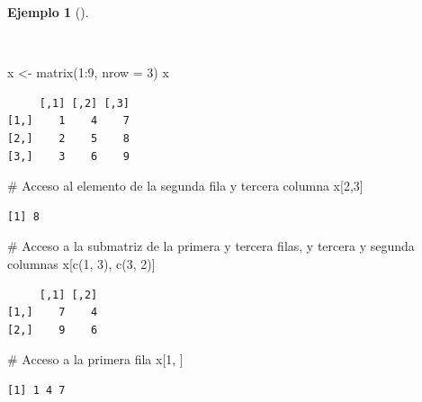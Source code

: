 \documentclass[
  a4paper,
]{scrreport}
\newenvironment{Shaded}{\begin{snugshade}}{\end{snugshade}}
\newcommand{\AttributeTok}[1]{\textcolor[rgb]{0.40,0.45,0.13}{#1}}
\newcommand{\CommentTok}[1]{\textcolor[rgb]{0.37,0.37,0.37}{#1}}
\newcommand{\DecValTok}[1]{\textcolor[rgb]{0.68,0.00,0.00}{#1}}
\newcommand{\FunctionTok}[1]{\textcolor[rgb]{0.28,0.35,0.67}{#1}}
\newcommand{\NormalTok}[1]{\textcolor[rgb]{0.00,0.23,0.31}{#1}}
\newcommand{\OtherTok}[1]{\textcolor[rgb]{0.00,0.23,0.31}{#1}}
\newcommand{\SpecialCharTok}[1]{\textcolor[rgb]{0.37,0.37,0.37}{#1}}
\theoremstyle{definition}
\theoremstyle{definition}
\newtheorem{example}{Ejemplo}[chapter]
\theoremstyle{remark}
\begin{document}
\begin{example}[]\protect\hypertarget{exm-acceso-matriz}{}\label{exm-acceso-matriz}

~

\begin{Shaded}
\begin{Highlighting}[]
\NormalTok{x }\OtherTok{\textless{}{-}} \FunctionTok{matrix}\NormalTok{(}\DecValTok{1}\SpecialCharTok{:}\DecValTok{9}\NormalTok{, }\AttributeTok{nrow =} \DecValTok{3}\NormalTok{)}
\NormalTok{x}
\end{Highlighting}
\end{Shaded}

\begin{verbatim}
     [,1] [,2] [,3]
[1,]    1    4    7
[2,]    2    5    8
[3,]    3    6    9
\end{verbatim}

\begin{Shaded}
\begin{Highlighting}[]
\CommentTok{\# Acceso al elemento de la segunda fila y tercera columna}
\NormalTok{x[}\DecValTok{2}\NormalTok{,}\DecValTok{3}\NormalTok{]}
\end{Highlighting}
\end{Shaded}

\begin{verbatim}
[1] 8
\end{verbatim}

\begin{Shaded}
\begin{Highlighting}[]
\CommentTok{\# Acceso a la submatriz de la primera y tercera filas, y tercera y segunda columnas}
\NormalTok{x[}\FunctionTok{c}\NormalTok{(}\DecValTok{1}\NormalTok{, }\DecValTok{3}\NormalTok{), }\FunctionTok{c}\NormalTok{(}\DecValTok{3}\NormalTok{, }\DecValTok{2}\NormalTok{)]}
\end{Highlighting}
\end{Shaded}

\begin{verbatim}
     [,1] [,2]
[1,]    7    4
[2,]    9    6
\end{verbatim}

\begin{Shaded}
\begin{Highlighting}[]
\CommentTok{\# Acceso a la primera fila}
\NormalTok{x[}\DecValTok{1}\NormalTok{, ]}
\end{Highlighting}
\end{Shaded}

\begin{verbatim}
[1] 1 4 7
\end{verbatim}


\end{example}
\end{document}
